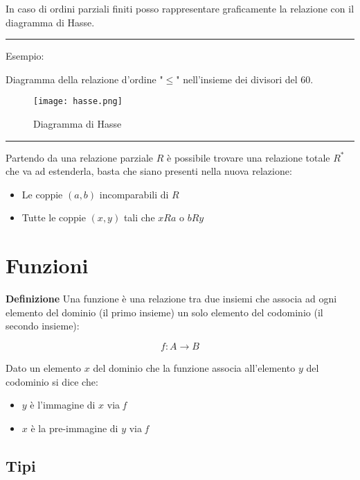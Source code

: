 \documentclass{article}
\begin{document}
\noindent In caso di ordini parziali finiti posso rappresentare graficamente la relazione con il diagramma di Hasse.

\noindent\rule{\textwidth}{0.5pt}

\noindent Esempio:\newline

\noindent Diagramma della relazione d'ordine "$\leq$" nell'insieme dei divisori del 60.

    \begin{figure}[ht]
        \centering
        \texttt{[image: hasse.png]}
        \caption{Diagramma di Hasse}
        \label{fig:hasse}
    \end{figure}

\noindent\rule{\textwidth}{0.5pt}\newline

\newpage

\noindent Partendo da una relazione parziale $R$ è possibile trovare una relazione totale $R^*$ che va ad estenderla, basta che siano presenti nella nuova relazione:
\begin{itemize}
    \item Le coppie $(a,b)$ incomparabili di $R$
    \item Tutte le coppie $(x,y)$ tali che $xRa$ o $bRy$
\end{itemize}

\section{Funzioni}

\textbf{Definizione} Una funzione è una relazione tra due insiemi che associa ad ogni elemento del dominio (il primo insieme) un solo elemento del codominio (il secondo insieme):

$$\textit{f}: A \rightarrow B$$\newline

\noindent Dato un elemento $x$ del dominio che la funzione associa all'elemento $y$ del codominio si dice che:
\begin{itemize}
    \item $y$ è l'immagine di $x$ via \textit{f}
    \item $x$ è la pre-immagine di $y$ via \textit{f}
\end{itemize}

\subsection{Tipi}
\end{document}
